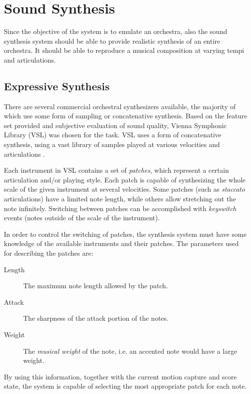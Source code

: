 \section{Sound Synthesis}

Since the objective of the system is to emulate an orchestra,
also the sound synthesis system should be able to
provide realistic synthesis of an entire orchestra.
It should be able to reproduce a musical composition
at varying tempi and articulations.

\subsection{Expressive Synthesis}
\label{subsec:expressive_synth}

There are several commercial orchestral synthesizers available,
the majority of which use some form of sampling or concatenative synthesis.
Based on the feature set provided and
subjective evaluation of sound quality,
Vienna Symphonic Library (VSL) \cite{vsl} was chosen for the task.
VSL uses a form of concatenative synthesis,
using a vast library of samples played at
various velocities and articulations \cite{schwartz2006}.

Each instrument in VSL contains a set of \textit{patches},
which represent a certain articulation and/or playing style.
Each patch is capable of synthesizing
the whole scale of the given instrument at several velocities.
Some patches (such as \textit{staccato} articulations)
have a limited note length,
while others allow stretching out the note infinitely.
Switching between patches can be accomplished with \textit{keyswitch} events
(notes outside of the scale of the instrument).

In order to control the switching of patches,
the synthesis system must have some knowledge of
the available instruments and their patches.
The parameters used for describing the patches are:
\begin{description}
\item[Length] The maximum note length allowed by the patch.
\item[Attack] The sharpness of the attack portion of the notes.
\item[Weight] The \textit{musical weight} of the note, i.e. an accented note would have a large weight.
\end{description}
By using this information,
together with the current motion capture and score state,
the system is capable of selecting
the most appropriate patch for each note.

